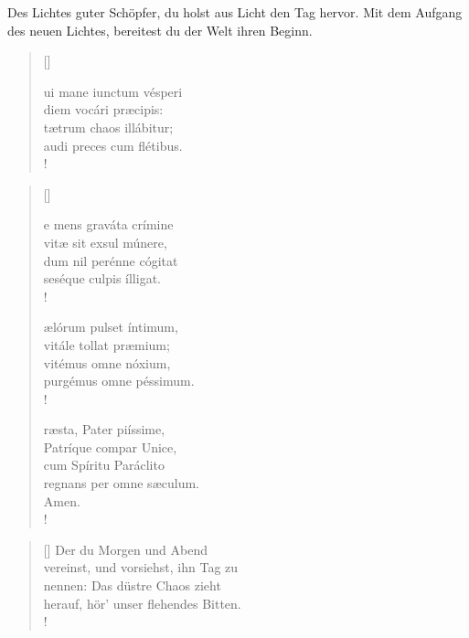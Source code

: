 \begin{sloppypar}
{\noindent\rm{ Des Lichtes guter Schöpfer, du holst aus Licht den Tag hervor.
Mit dem Aufgang des neuen Lichtes, bereitest du der Welt ihren Beginn.}}
\end{sloppypar}

\medskip

{\setlength{\columnsep}{1cm}
\begin{multicols}{2} 
\begin{verse}[\versewidth]
 
{\small{
ui mane iunctum vésperi\\
diem vocári præcipis:\\
tætrum chaos illábitur;\\
audi preces cum flétibus.\\!}}
\end{verse}






\begin{verse}[\versewidth]
 
{\small{
e mens graváta crímine\\
vitæ sit exsul múnere,\\ 
dum nil perénne cógitat\\
seséque culpis ílligat.\\!

ælórum pulset íntimum,\\
vitále tollat præmium;\\
vitémus omne nóxium,\\ 
purgémus omne péssimum.\\!



ræsta, Pater piíssime,\\ 
Patríque compar Unice,\\ 
cum Spíritu Paráclito\\
regnans per omne sæculum.\\
Amen.\\!}}

\end{verse}

\begin{verse}[\versewidth]
{\small\rm{ Der du Morgen und Abend\\
vereinst, und vorsiehst, ihn Tag zu\\
nennen: Das düstre Chaos zieht\\
herauf, hör' unser flehendes Bitten.\\!}}
\end{verse}




\end{multicols}}
